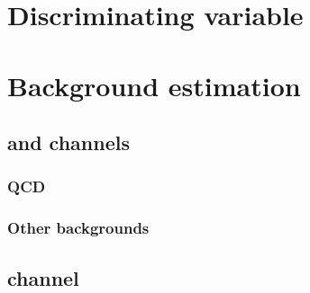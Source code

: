 \section{Discriminating variable}
\label{sec:mssm_discrvar}

\section{Background estimation}
\label{sec:mssm_bkgs}

\subsection{\texorpdfstring{\mutau and \etau channels}{mutau and etau channels}}
\label{sec:mssm_bkgs_mtet}

\subsubsection{\texorpdfstring{\Ztautau}{Z to tau tau}}
\label{sec:mssm_bkgs_mtet_ztt}

\subsubsection{\texorpdfstring{\Wjets}{W+jets}}
\label{sec:mssm_bkgs_mtet_wjets}

\subsubsection{QCD}
\label{sec:mssm_bkgs_mtet_qcd}

\subsubsection{\texorpdfstring{\ttbar}{ttbar}}
\label{sec:mssm_bkgs_mtet_tt}

\subsubsection{Other backgrounds}
\label{sec:mssm_bkgs_mtet_other}

\subsection{\texorpdfstring{\tautau channel}{tautau channel}}
\label{sec:mssm_bkgs_tt}

\subsubsection{\texorpdfstring{\Ztautau}{Z to tau tau}}
\label{sec:mssm_bkgs_tt_ztt}

